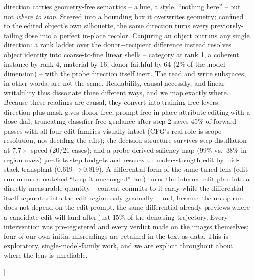 \documentclass[10pt,twocolumn]{article}
\begin{document}
\begin{center}
\begin{minipage}{0.92\textwidth}
  direction carries geometry-free semantics -- a hue, a style,
  ``nothing here'' -- but not \emph{where to stop}. Steered into a
  bounding box it overwrites geometry; confined to the edited object's
  own silhouette, the same direction turns every previously-failing
  dose into a perfect in-place recolor. Conjuring an object outruns any
  single direction: a rank ladder over the donor$-$recipient difference
  instead resolves object identity into coarse-to-fine linear shells --
  category at rank 1, a coherent instance by rank 4, material by 16,
  donor-faithful by 64 ($2\%$ of the model dimension) -- with the probe
  direction itself inert. The read and write subspaces, in other words,
  are not the same. Readability, causal necessity, and linear
  writability thus dissociate three different ways, and we map exactly
  where. Because these
  readings are causal, they convert into training-free levers:
  direction-plus-mask gives donor-free, prompt-free in-place attribute
  editing with a dose dial; truncating classifier-free guidance after
  step 2 saves 45\% of forward passes with all four edit families
  visually intact (CFG's real role is scope resolution, not deciding
  the edit); the decision structure survives step distillation at
  $7.7\times$ speed (20/20 cases); and a probe-derived saliency map
  (99\% vs.\ 38\% in-region mass) predicts step budgets and rescues an
  under-strength edit by mid-stack transplant (0.619$\to$0.819). A
  differential form of the same tuned lens (edit run minus a matched
  ``keep it unchanged'' run) turns the internal edit plan into a
  directly measurable quantity -- content commits to it early while the
  differential itself separates into the edit region only gradually --
  and, because the no-op run does not depend on the edit prompt, the
  same differential already previews where a candidate edit will land
  after just 15\% of the denoising trajectory. Every
  intervention was pre-registered and every verdict made on the images
  themselves; four of our own initial misreadings are retained in the
  text as data. This is exploratory, single-model-family work, and we
  are explicit throughout about where the lens is unreliable.
  \vspace{1.0em}
  \end{minipage}\end{center}
]
\end{document}
